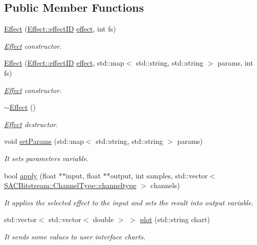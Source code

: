 \subsection*{Public Member Functions}
\begin{DoxyCompactItemize}
\item 
\hyperlink{class_effect_a6ab7116f826b2607ada4630759f6afc5}{Effect} (\hyperlink{class_effect_a6422fe21e9e452943fbc3344884a6fed}{Effect\+::effect\+ID} \hyperlink{class_effect_ae23ae4e48c344fa374730a9ae24e7ad3}{effect}, int fs)
\begin{DoxyCompactList}\small\item\em \hyperlink{class_effect}{Effect} constructor. \end{DoxyCompactList}\item 
\hyperlink{class_effect_a2fbf9d2526c65543157370f68cbed091}{Effect} (\hyperlink{class_effect_a6422fe21e9e452943fbc3344884a6fed}{Effect\+::effect\+ID} \hyperlink{class_effect_ae23ae4e48c344fa374730a9ae24e7ad3}{effect}, std\+::map$<$ std\+::string, std\+::string $>$ params, int fs)
\begin{DoxyCompactList}\small\item\em \hyperlink{class_effect}{Effect} constructor. \end{DoxyCompactList}\item 
\mbox{\label{class_effect_ac26c0a394247e14c9081f875522b5b66}} 
\hyperlink{class_effect_ac26c0a394247e14c9081f875522b5b66}{$\sim$\+Effect} ()
\begin{DoxyCompactList}\small\item\em \hyperlink{class_effect}{Effect} destructor. \end{DoxyCompactList}\item 
void \hyperlink{class_effect_af0094495d423173463fd3e9cd40789af}{set\+Params} (std\+::map$<$ std\+::string, std\+::string $>$ params)
\begin{DoxyCompactList}\small\item\em It sets parameters variable. \end{DoxyCompactList}\item 
bool \hyperlink{class_effect_a6d212ada944f12afbcd8e3e6e623df51}{apply} (float $\ast$$\ast$input, float $\ast$$\ast$output, int samples, std\+::vector$<$ \hyperlink{struct_s_a_c_bitstream_1_1_channel_type_a31c32b34085c06a1c58d920ca28c17c9}{S\+A\+C\+Bitstream\+::\+Channel\+Type\+::channeltype} $>$ channels)
\begin{DoxyCompactList}\small\item\em It applies the selected effect to the input and sets the result into output variable. \end{DoxyCompactList}\item 
std\+::vector$<$ std\+::vector$<$ double $>$ $>$ \hyperlink{class_effect_ac2c35ce7382d627f20879b44be0e8132}{plot} (std\+::string chart)
\begin{DoxyCompactList}\small\item\em It sends some values to user interface charts. \end{DoxyCompactList}\end{DoxyCompactItemize}

